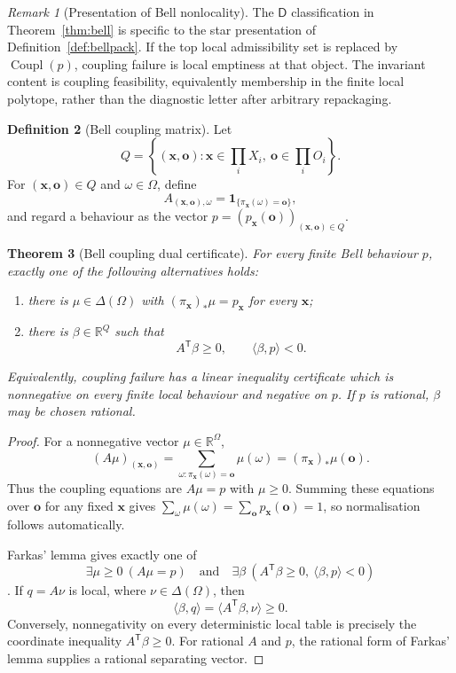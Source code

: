 \documentclass[11pt]{article}
\theoremstyle{plain}
\newtheorem{theorem}{Theorem}[section]
\theoremstyle{definition}
\newtheorem{definition}[theorem]{Definition}
\theoremstyle{remark}
\newtheorem{remark}[theorem]{Remark}
\begin{document}
\begin{remark}[Presentation of Bell nonlocality]
The $\mathsf D$ classification in Theorem~\ref{thm:bell} is specific to the star
presentation of Definition~\ref{def:bellpack}. If the top local admissibility set
is replaced by $\operatorname{Coupl}(p)$, coupling failure is local emptiness at
that object. The invariant content is coupling feasibility, equivalently
membership in the finite local polytope, rather than the diagnostic letter after
arbitrary repackaging.
\end{remark}

\begin{definition}[Bell coupling matrix]\label{def:bell-matrix}
Let
\[
Q=\left\{(\mathbf x,\mathbf o):
\mathbf x\in\prod_iX_i,\ 
\mathbf o\in\prod_iO_i\right\}.
\]
For $(\mathbf x,\mathbf o)\in Q$ and $\omega\in\Omega$, define
\[
A_{(\mathbf x,\mathbf o),\omega}
=\mathbf 1_{\{\pi_{\mathbf x}(\omega)=\mathbf o\}},
\]
and regard a behaviour as the vector
$p=(p_{\mathbf x}(\mathbf o))_{(\mathbf x,\mathbf o)\in Q}$.
\end{definition}

\begin{theorem}[Bell coupling dual certificate]\label{thm:bell-dual}
For every finite Bell behaviour $p$, exactly one of the following alternatives
holds:
\begin{enumerate}[label=(\roman*)]
\item there is $\mu\in\Delta(\Omega)$ with
$(\pi_{\mathbf x})_*\mu=p_{\mathbf x}$ for every $\mathbf x$;
\item there is $\beta\in\mathbb R^Q$ such that
\[
A^{\mathsf T}\beta\ge0,
\qquad
\langle\beta,p\rangle<0.
\]
\end{enumerate}
Equivalently, coupling failure has a linear inequality certificate which is
nonnegative on every finite local behaviour and negative on $p$. If $p$ is
rational, $\beta$ may be chosen rational.
\end{theorem}

\begin{proof}
For a nonnegative vector $\mu\in\mathbb R^\Omega$,
\[
(A\mu)_{(\mathbf x,\mathbf o)}
=\sum_{\omega:\pi_{\mathbf x}(\omega)=\mathbf o}\mu(\omega)
=(\pi_{\mathbf x})_*\mu(\mathbf o).
\]
Thus the coupling equations are $A\mu=p$ with $\mu\ge0$. Summing these
equations over $\mathbf o$ for any fixed $\mathbf x$ gives
$\sum_\omega\mu(\omega)=\sum_{\mathbf o}p_{\mathbf x}(\mathbf o)=1$, so
normalisation follows automatically.

Farkas' lemma gives exactly one of
\[
\exists\mu\ge0\ (A\mu=p)
\quad\text{and}\quad
\exists\beta\ (A^{\mathsf T}\beta\ge0,
\ \langle\beta,p\rangle<0)
\]
\cite{schrijver}. If $q=A\nu$ is local, where
$\nu\in\Delta(\Omega)$, then
\[
\langle\beta,q\rangle
=\langle A^{\mathsf T}\beta,\nu\rangle\ge0.
\]
Conversely, nonnegativity on every deterministic local table is precisely the
coordinate inequality $A^{\mathsf T}\beta\ge0$. For rational $A$ and $p$, the
rational form of Farkas' lemma supplies a rational separating vector.
\end{proof}
\end{document}
